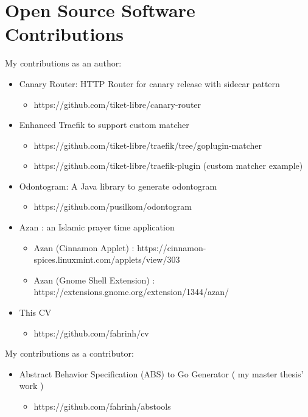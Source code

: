 \documentclass[11pt,a4paper,sans]{moderncv} %
\begin{document}
\section{Open Source Software Contributions}
{
My contributions as an author:
\begin{itemize}
    \item Canary Router: HTTP Router for canary release with sidecar pattern
      \begin{itemize}
        \item https://github.com/tiket-libre/canary-router
      \end{itemize}
    \item Enhanced Traefik to support custom matcher
      \begin{itemize}
        \item https://github.com/tiket-libre/traefik/tree/goplugin-matcher
        \item https://github.com/tiket-libre/traefik-plugin (custom matcher example)
      \end{itemize}
    \item Odontogram: A Java library to generate odontogram
      \begin{itemize}
        \item https://github.com/pusilkom/odontogram
      \end{itemize}
    \item Azan : an Islamic prayer time application
      \begin{itemize}
        \item Azan (Cinnamon Applet) : https://cinnamon-spices.linuxmint.com/applets/view/303
        \item Azan (Gnome Shell Extension) : https://extensions.gnome.org/extension/1344/azan/
      \end{itemize}
    \item This CV
      \begin{itemize}
        \item https://github.com/fahrinh/cv
      \end{itemize}
 \end{itemize}
}
{
My contributions as a contributor:
\begin{itemize}
    \item Abstract Behavior Specification (ABS) to Go Generator ( my master thesis' work )
    \begin{itemize}
        \item https://github.com/fahrinh/abstools
    \end{itemize}
\end{itemize}
}
\end{document}
